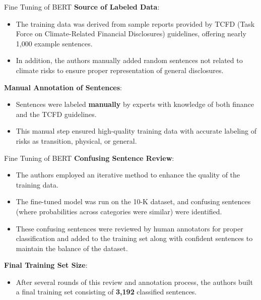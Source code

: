 \documentclass[11pt]{beamer}
\newcommand{\hly}[1]{\colorbox{yellow!100}{#1}}
\begin{document}
\begin{frame}{Fine Tuning of BERT}
\textbf{Source of Labeled Data}:

	\begin{itemize}
		\item The \hly{training data} was derived from sample reports provided by TCFD (Task Force on Climate-Related Financial Disclosures) guidelines, offering nearly 1,000 example sentences.

		\item In addition, the authors manually added random sentences not related to climate risks to ensure proper representation of general disclosures.

	\end{itemize}
\textbf{Manual Annotation of Sentences}:

	\begin{itemize}
		\item Sentences were labeled \textbf{manually} by experts with knowledge of both finance and the TCFD guidelines. 

		\item This manual step ensured high-quality training data with accurate labeling of risks as transition, physical, or general.
	\end{itemize}
\end{frame}
\begin{frame}{Fine Tuning of BERT}
\textbf{Confusing Sentence Review}:

	\begin{itemize}
		\item The authors employed an iterative method to enhance the quality of the training data. 

		\item The fine-tuned model was run on the 10-K dataset, and confusing sentences (where probabilities across categories were similar) were identified.

		\item These confusing sentences were reviewed by human annotators for proper classification and added to the training set along with confident sentences to maintain the balance of the dataset.

	\end{itemize}
\textbf{Final Training Set Size}:

	\begin{itemize}
		\item After several rounds of this review and annotation process, the authors built a final training set consisting of \textbf{3,192} classified sentences.
	\end{itemize}
\end{frame}
\end{document}
